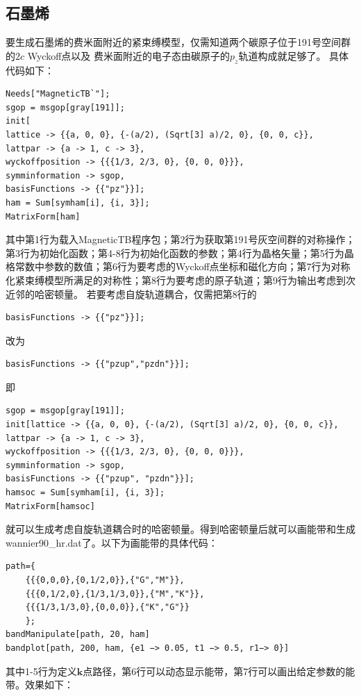 \documentclass[titlepage,a4paper,12pt,AutoFakeBold]{article}
\begin{document}
\subsection{石墨烯}
\label{gra}
要生成石墨烯的费米面附近的紧束缚模型，仅需知道两个碳原子位于191号空间群的$2c$ Wyckoff点以及
费米面附近的电子态由碳原子的$p_z$轨道构成就足够了。
具体代码如下：
\begin{lstlisting}
Needs["MagneticTB`"];
sgop = msgop[gray[191]];
init[
lattice -> {{a, 0, 0}, {-(a/2), (Sqrt[3] a)/2, 0}, {0, 0, c}},
lattpar -> {a -> 1, c -> 3},
wyckoffposition -> {{{1/3, 2/3, 0}, {0, 0, 0}}},
symminformation -> sgop,
basisFunctions -> {{"pz"}}];
ham = Sum[symham[i], {i, 3}]; 
MatrixForm[ham]
\end{lstlisting}
其中第1行为载入\textsf{MagneticTB}程序包；第2行为获取第191号灰空间群的对称操作；第3行为初始化函数；第4-8行为初始化函数的参数；第4行为晶格矢量；第5行为晶格常数中参数的数值；第6行为要考虑的Wyckoff点坐标和磁化方向；第7行为对称化紧束缚模型所满足的对称性；第8行为要考虑的原子轨道；第9行为输出考虑到次近邻的哈密顿量。
若要考虑自旋轨道耦合，仅需把第8行的
\begin{lstlisting}[numbers=none]
	basisFunctions -> {{"pz"}}];
\end{lstlisting}
改为
\begin{lstlisting}[numbers=none]
	basisFunctions -> {{"pzup","pzdn"}}];
\end{lstlisting}
即
\begin{lstlisting}[numbers=none]
sgop = msgop[gray[191]];
init[lattice -> {{a, 0, 0}, {-(a/2), (Sqrt[3] a)/2, 0}, {0, 0, c}}, 
lattpar -> {a -> 1, c -> 3}, 
wyckoffposition -> {{{1/3, 2/3, 0}, {0, 0, 0}}}, 
symminformation -> sgop,
basisFunctions -> {{"pzup", "pzdn"}}];
hamsoc = Sum[symham[i], {i, 3}]; 
MatrixForm[hamsoc]
\end{lstlisting}
就可以生成考虑自旋轨道耦合时的哈密顿量。得到哈密顿量后就可以画能带和生成wannier90\_hr.dat了。以下为画能带的具体代码：
\begin{lstlisting}
path={
	{{{0,0,0},{0,1/2,0}},{"G","M"}},
	{{{0,1/2,0},{1/3,1/3,0}},{"M","K"}},
	{{{1/3,1/3,0},{0,0,0}},{"K","G"}}
	};
bandManipulate[path, 20, ham]
bandplot[path, 200, ham, {e1 −> 0.05, t1 −> 0.5, r1−> 0}]
\end{lstlisting}
其中1-5行为定义$\boldsymbol{k}$点路径，第6行可以动态显示能带，第7行可以画出给定参数的能带。效果如下：
\end{document}
